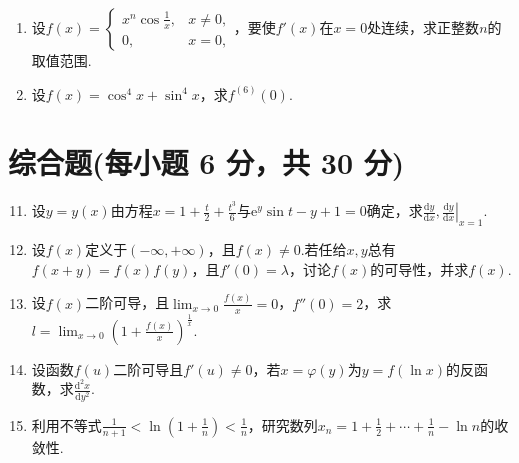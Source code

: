 \documentclass[../main.tex]{subfiles}
\begin{document}
\begin{enumerate}
    \item 设$f(x)=
              \begin{cases}
                  x^{n} \cos\frac{1}{x}, & x\neq0, \\
                  0,                     & x=0,
              \end{cases}$，要使$f'(x)$在$x=0$处连续，求正整数$n$的取值范围.
          \vspace{10em}

    \item 设$f(x)=\cos^{4} x+\sin^{4} x$，求$f^{(6)}(0)$.
          \vspace{10em}
\end{enumerate}

\section{综合题(每小题 6 分，共 30 分)}
\begin{enumerate}
    \setcounter{enumi}{10}
    \item 设$y=y(x)$由方程$x=1+\frac{t}{2}+\frac{t^{3}}{6}$与$\mathrm{e}^{y}
              \sin t-y+1=0$确定，求$\frac{\mathrm{d}y}{\mathrm{d}x},\left.\frac{\mathrm{d}y}{\mathrm{d}x}
              \right|_{x=1}$.
          \vspace{13em}

    \item 设$f(x)$定义于$(-\infty,+\infty)$，且$f(x)\neq0$.若任给$x,y$总有$f
              (x+y)=f(x)f(y)$，且$f'(0)=\lambda$，讨论$f(x)$的可导性，并求$f(x)$.
          \vspace{13em}

    \item 设$f(x)$二阶可导，且$\lim_{x\to0}\frac{f(x)}{x}=0$，$f''(0)=2$，求$l
              =\lim_{x\to0}\left(1+\frac{f(x)}{x}\right)^{\frac{1}{x}}$.
          \vspace{8em}

    \item 设函数$f(u)$二阶可导且$f'(u)\neq0$，若$x=\varphi(y)$为$y=f(\ln x)$的反函数，求$\frac{\mathrm{d}^{2}
                  x}{\mathrm{d}y^{2}}$.
          \vspace{8em}

    \item 利用不等式$\frac{1}{n+1}<\ln\left(1+\frac{1}{n}\right)<\frac{1}{n}$，研究数列$x
                  _{n}=1+\frac{1}{2}+\cdots+\frac{1}{n}-\ln n$的收敛性.
          \vspace{8em}
\end{enumerate}
\end{document}
